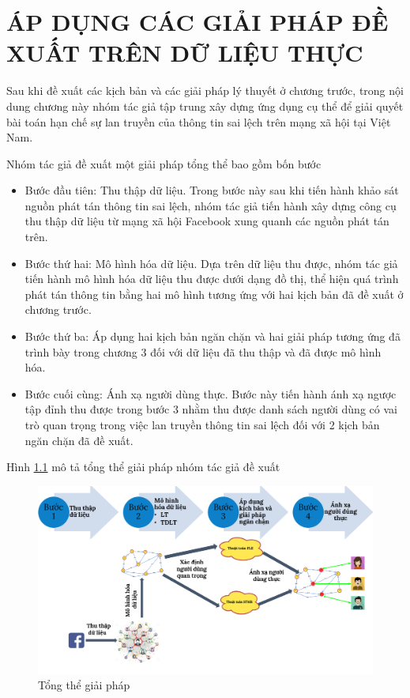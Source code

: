 \chapter{ÁP DỤNG CÁC GIẢI PHÁP ĐỀ XUẤT TRÊN DỮ LIỆU THỰC}
\thispagestyle{fancy}

Sau khi đề xuất các kịch bản và các giải pháp lý thuyết ở chương trước, trong nội dung chương này nhóm tác giả tập trung xây dựng ứng dụng cụ thể để giải quyết bài toán hạn chế sự lan truyền của thông tin sai lệch trên mạng xã hội tại Việt Nam.

Nhóm tác giả đề xuất một giải pháp tổng thể bao gồm bốn bước
\begin{itemize}
	\item Bước đầu tiên: Thu thập dữ liệu. Trong bước này sau khi tiến hành khảo sát nguồn phát tán thông tin sai lệch, nhóm tác giả tiến hành xây dựng công cụ thu thập dữ liệu từ mạng xã hội Facebook xung quanh các nguồn phát tán trên.
	\item Bước thứ hai: Mô hình hóa dữ liệu. Dựa trên dữ liệu thu được, nhóm tác giả tiến hành mô hình hóa dữ liệu thu được dưới dạng đồ thị, thể hiện quá trình phát tán thông tin bằng hai mô hình tương ứng với hai kịch bản đã đề xuất ở chương trước.
	\item Bước thứ ba: Áp dụng hai kịch bản ngăn chặn và hai giải pháp tương ứng đã trình bày trong chương 3 đối với dữ liệu đã thu thập và đã được mô hình hóa.
	\item Bước cuối cùng: Ánh xạ người dùng thực. Bước này tiến hành ánh xạ ngược tập đỉnh thu được trong bước 3 nhằm thu được danh sách người dùng có vai trò quan trọng trong việc lan truyền thông tin sai lệch đối với 2 kịch bản ngăn chặn đã đề xuất.
\end{itemize}

Hình \ref{TongTheGiaiPhap} mô tả tổng thể giải pháp nhóm tác giả đề xuất
\begin{center}
	\begin{figure}[!htp]
		\begin{center}
			\includegraphics [scale=.3]{picture/TongTheGiaiPhap}
		\end{center}
		\caption{Tổng thể giải pháp}
		\label{TongTheGiaiPhap}
	\end{figure}
\end{center}

